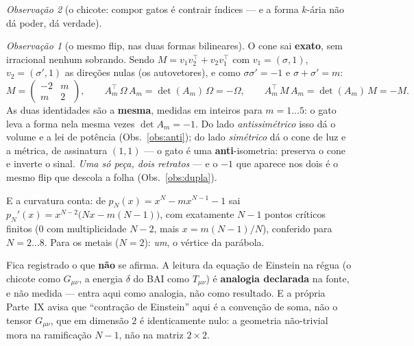 \documentclass[11pt]{article}
\theoremstyle{plain}
\theoremstyle{remark}
\newtheorem{obs}{Observação}
\begin{document}
\begin{obs}[o chicote: compor gatos é contrair índices --- e a forma $k$-ária não dá poder, dá verdade]
\begin{obs}[o mesmo flip, nas duas formas bilineares]\label{obs:cone}
O cone sai \textbf{exato}, sem irracional nenhum sobrando. Sendo $M=v_1v_2^{\!\top}+v_2v_1^{\!\top}$ com
$v_1=(\sigma,1)$, $v_2=(\sigma',1)$ as direções nulas (os autovetores), e como $\sigma\sigma'=-1$ e
$\sigma+\sigma'=m$:
\[
 M=\begin{pmatrix}-2 & m\\ m & 2\end{pmatrix},
 \qquad
 A_m^{\!\top}\,\Omega\,A_m=\det(A_m)\,\Omega=-\Omega,
 \qquad
 A_m^{\!\top}\,M\,A_m=\det(A_m)\,M=-M.
\]
As duas identidades são a \textbf{mesma}, medidas em inteiros para $m=1\ldots5$: o gato leva a forma
nela mesma vezes $\det A_m=-1$. Do lado \emph{antissimétrico} isso dá o volume e a lei de potência
(Obs.~\ref{obs:anti}); do lado \emph{simétrico} dá o cone de luz e a métrica, de assinatura $(1,1)$ ---
o gato é uma \textbf{anti}-isometria: preserva o cone e inverte o sinal. \emph{Uma só peça, dois
retratos} --- e o $-1$ que aparece nos dois é o mesmo flip que descola a folha (Obs.~\ref{obs:dupla}).

E a curvatura conta: de $p_N(x)=x^N-mx^{N-1}-1$ sai $p_N'(x)=x^{N-2}\bigl(Nx-m(N-1)\bigr)$, com
exatamente $N-1$ pontos críticos finitos ($0$ com multiplicidade $N-2$, mais $x=m(N-1)/N$), conferido
para $N=2\ldots8$. Para os metais ($N=2$): \emph{um}, o vértice da parábola.
\end{obs}

\noindent Fica registrado o que \textbf{não} se afirma. A leitura da equação de Einstein na régua
(o chicote como $G_{\mu\nu}$, a energia $\delta$ do BAI como $T_{\mu\nu}$) é \textbf{analogia
declarada} na fonte, e não medida --- entra aqui como analogia, não como resultado. E a própria
Parte~IX avisa que ``contração de Einstein'' aqui é a convenção de soma, não o tensor $G_{\mu\nu}$,
que em dimensão $2$ é identicamente nulo: a geometria não-trivial mora na ramificação $N-1$, não na
matriz $2\times2$.
\end{obs}
\end{document}
